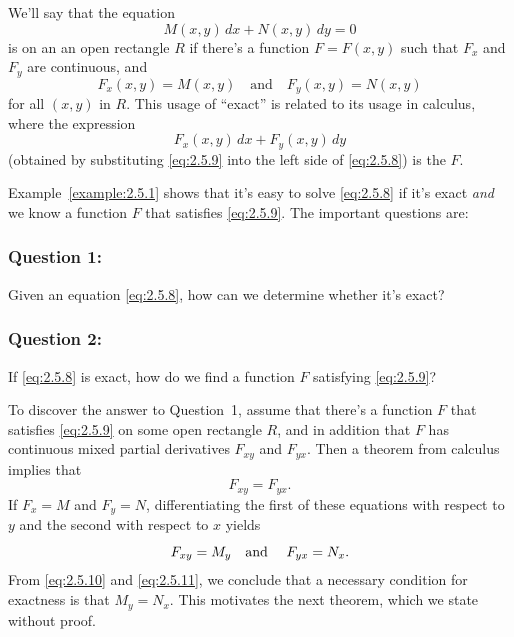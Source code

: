 \documentclass{ximera}
\begin{document}
We'll say that  the equation
\begin{equation} \label{eq:2.5.8}
M(x,y)\,dx+N(x,y)\,dy=0
\end{equation}
 is   on an an open rectangle  $R$ if there's
a function $F=F(x,y)$ such  that $F_x$
and $F_y$  are continuous, and
\begin{equation} \label{eq:2.5.9}
F_x(x,y)=M(x,y) \quad \text{and}\quad F_y(x,y)=N(x,y)
\end{equation}
for  all  $(x,y)$ in $R$.
This usage of ``exact'' is related  to its usage in calculus,
where the expression
$$
F_x(x,y)\,dx+F_y(x,y)\,dy
$$
(obtained by substituting \eqref{eq:2.5.9} into the left side of
\eqref{eq:2.5.8}) is the   $F$.

Example~\ref{example:2.5.1} shows that it's easy to solve
\eqref{eq:2.5.8}
if it's exact \textit{and}  we know a function $F$ that satisfies
\eqref{eq:2.5.9}. The important questions are:

 \subsubsection*{Question 1:}  Given an equation
\eqref{eq:2.5.8}, how can we determine whether it's  exact?

 \subsubsection*{Question 2:} If \eqref{eq:2.5.8} is exact, how do we find
a function $F$ satisfying \eqref{eq:2.5.9}?

To discover the answer to Question~1,
 assume that  there's a function $F$  that satisfies \eqref{eq:2.5.9} on
some open rectangle $R$, and in addition that $F$ has continuous mixed
partial derivatives $F_{xy}$ and $F_{yx}$.  Then a theorem from calculus
implies that
\begin{equation} \label{eq:2.5.10}
F_{xy}=F_{yx}.
\end{equation}
If $F_x=M$ and $F_y=N$,
differentiating the first of these equations with respect to
$y$ and the second with respect to $x$ yields
\begin{equation} \label{eq:2.5.11}
F_{xy}=M_y\mbox{\quad and \quad}  F_{yx}=N_x.
\end{equation}
From  \eqref{eq:2.5.10}  and \eqref{eq:2.5.11}, we conclude that
 a necessary condition for exactness is that $M_y=N_x$.
This motivates the next theorem, which we state without proof.
\end{document}
